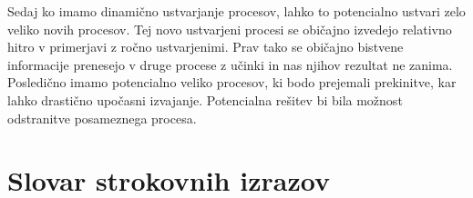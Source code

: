 Sedaj ko imamo dinamično ustvarjanje procesov, lahko to potencialno ustvari zelo veliko novih procesov. Tej novo ustvarjeni procesi se običajno izvedejo relativno hitro v primerjavi z ročno ustvarjenimi. Prav tako se običajno bistvene informacije prenesejo v druge procese z učinki in nas njihov rezultat ne zanima. Posledično imamo potencialno veliko procesov, ki bodo prejemali prekinitve, kar lahko drastično upočasni izvajanje. Potencialna rešitev bi bila možnost odstranitve posameznega procesa.

\section*{Slovar strokovnih izrazov}





